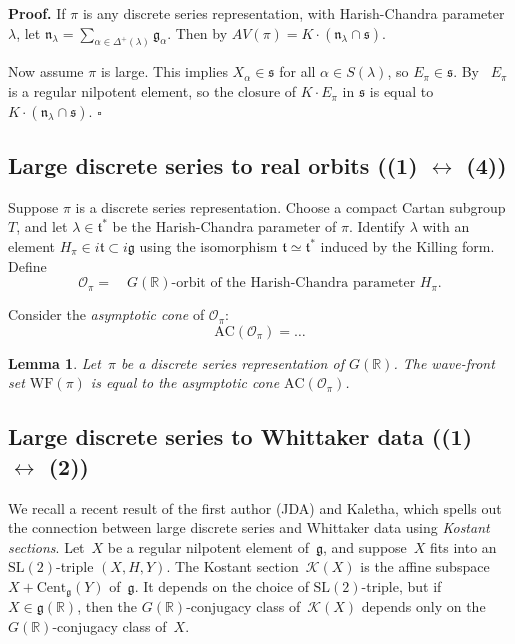 \documentclass[10pt,leqno]{article}
\newtheorem{lemma}[equation]{Lemma}
\newcommand{\qed}{\hfill $\square$ \medskip}
\newenvironment{proof}[1][Proof]{\noindent\textbf{#1.} }{\qed}
\newcommand{\R}{\mathbb R}
\newcommand{\n}{\mathfrak n}
\renewcommand{\t}{\mathfrak t}
\newcommand{\g}{\mathfrak g}
\newcommand{\SL}{\text{SL}}
\newcommand{\s}{\mathfrak s}
\newcommand{\WF}{\mathrm{WF}}
\newcommand{\AC}{\mathrm{AC}}
\newcommand{\Kostant}[1]{\mathcal{K}(#1)}
\begin{document}
\begin{proof}
If $\pi$ is any discrete series representation, with Harish-Chandra parameter $\lambda$, let
$\n_{\lambda}=\sum_{\alpha\in\Delta^+(\lambda)}\g_\alpha$.
Then by \cite[Proposition 6.8]{vogan_irreducibility} $AV(\pi)=K\cdot(\n_\lambda\cap\s)$. 

Now assume $\pi$ is large. This implies $X_\alpha\in\s$ for all $\alpha\in S(\lambda)$, so $E_\pi\in \s$. 
By~\cite{kostant_tds} $E_\pi$ is a regular nilpotent element, so the closure of $K\cdot E_\pi$ in $\s$ is equal to $K\cdot(\n_\lambda\cap\s)$. 
\end{proof}




\subsection{Large discrete series to real orbits ((1) $\leftrightarrow$ (4))}


Suppose $\pi$ is a discrete series representation.
Choose a compact Cartan subgroup $T$, and let $\lambda\in\t^*$ be the Harish-Chandra parameter of $\pi$.
Identify $\lambda$ with an element $H_\pi\in i\t\subset i\g$ using the isomorphism $\t\simeq \t^*$ induced by the Killing form. 
Define
\begin{equation} \label{semisimple_orbit_HC} \mathcal{O}_{\pi}=\quad \text{$G(\R)$-orbit of the Harish-Chandra parameter $H_\pi$}.\end{equation}

Consider the \emph{asymptotic cone} of $\mathcal{O}_\pi$:
\[ \AC(\mathcal{O}_\pi) = \dots \]

\begin{lemma} \label{lem:WF_and_AC}
Let~$\pi$ be a discrete series representation of $G(\R)$. The wave-front set $\WF(\pi)$ is equal to the asymptotic cone $\AC(\mathcal{O}_\pi)$.
\end{lemma}

\subsection{Large discrete series to Whittaker data ((1) $\leftrightarrow$ (2))}


We recall a recent result of the first author (JDA) and Kaletha, which spells out the connection between large discrete series and Whittaker data using  {\it Kostant sections}. Let~$X$ be a regular nilpotent element of~$\g$, and suppose~$X$ fits into an $\SL(2)$-triple $(X, H, Y)$. The Kostant section~$\Kostant{X}$ is the affine subspace $X + \mathrm{Cent}_{\g}(Y)$ of~$\g$. It depends on the choice of $\SL(2)$-triple, but if $X \in \g(\R)$, then the $G(\R)$-conjugacy class of~$\Kostant{X}$ depends only on the $G(\R)$-conjugacy class of~$X$. 
\end{document}
